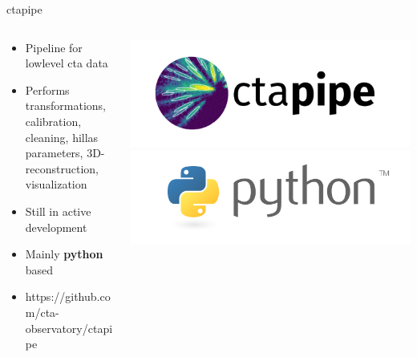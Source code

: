 \begin{frame}{ctapipe}
    \begin{columns}[T] %
        \begin{column}{.45\textwidth}
            \vspace{10pt}
            \begin{itemize}
                \item { Pipeline for lowlevel cta data}
                \item { Performs transformations, calibration, cleaning,
                        hillas parameters, 3D-reconstruction, visualization}
                \item { Still in active development}
                \item { Mainly \textbf{python} based}
                \item { https://github.com/cta-observatory/ctapipe}
            \end{itemize}
        \end{column}
        \begin{column}{.48\textwidth}
            \includegraphics[width=\linewidth]{images/ctapipe_logo.png}
            \includegraphics[width=\linewidth]{images/python_logo.png}
        \end{column}
    \end{columns}
\end{frame}
